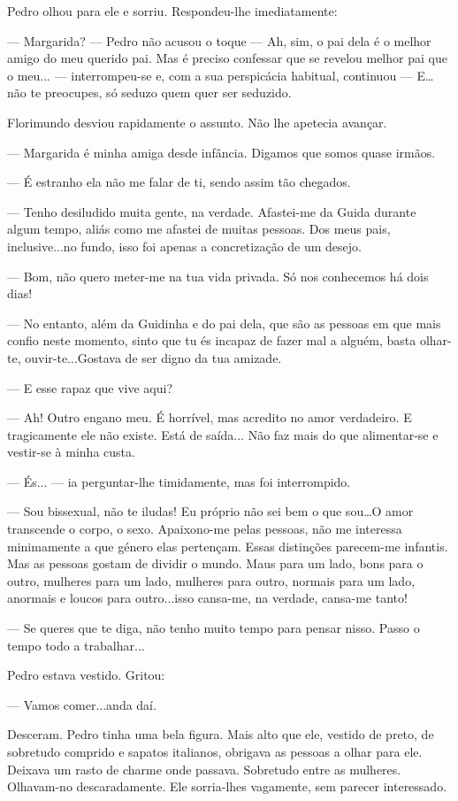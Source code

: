 Pedro olhou para ele e sorriu. Respondeu-lhe imediatamente:

--- Margarida? --- Pedro não acusou o toque --- Ah, sim, o pai dela é o melhor
amigo do meu querido pai. Mas é preciso confessar que se revelou melhor
pai que o meu... --- interrompeu-se e, com a sua perspicácia habitual,
continuou ---  E\ldots{}não te preocupes, só seduzo quem quer ser
seduzido.

Florimundo desviou rapidamente o assunto. Não lhe apetecia avançar.

--- Margarida é minha amiga desde infância. Digamos que somos quase
irmãos.

--- É estranho ela não me falar de ti, sendo assim tão chegados.

--- Tenho desiludido muita gente, na verdade. Afastei-me da Guida durante
algum tempo, aliás como me afastei de muitas pessoas. Dos meus pais,
inclusive...no fundo, isso foi apenas a concretização de um desejo.

--- Bom, não quero meter-me na tua vida privada. Só nos conhecemos há dois
dias!

--- No entanto, além da Guidinha e do pai dela, que são as pessoas em que
mais confio neste momento, sinto que tu és incapaz de fazer mal a
alguém, basta olhar-te, ouvir-te...Gostava de ser digno da tua amizade.

--- E esse rapaz que vive aqui?

--- Ah! Outro engano meu. É horrível, mas acredito no amor verdadeiro. E
tragicamente ele não existe. Está de saída... Não faz mais do que
alimentar-se e vestir-se à minha custa.

--- És... --- ia perguntar-lhe timidamente, mas foi interrompido.

--- Sou bissexual, não te iludas! Eu próprio não sei bem o que
sou\ldots{}O amor transcende o corpo, o sexo. Apaixono-me pelas pessoas,
não me interessa minimamente a que género elas pertençam. Essas
distinções parecem-me infantis. Mas as pessoas gostam de dividir o
mundo. Maus para um lado, bons para o outro, mulheres para um lado,
mulheres para outro, normais para um lado, anormais e loucos para
outro...isso cansa-me, na verdade, cansa-me tanto!

--- Se queres que te diga, não tenho muito tempo para pensar nisso. Passo
o tempo todo a trabalhar...

Pedro estava vestido. Gritou:

--- Vamos comer...anda daí.

Desceram. Pedro tinha uma bela figura. Mais alto que ele, vestido de
preto, de sobretudo comprido e sapatos italianos, obrigava as pessoas a
olhar para ele. Deixava um rasto de charme onde passava. Sobretudo entre
as mulheres. Olhavam-no descaradamente. Ele sorria-lhes vagamente, sem
parecer interessado.

